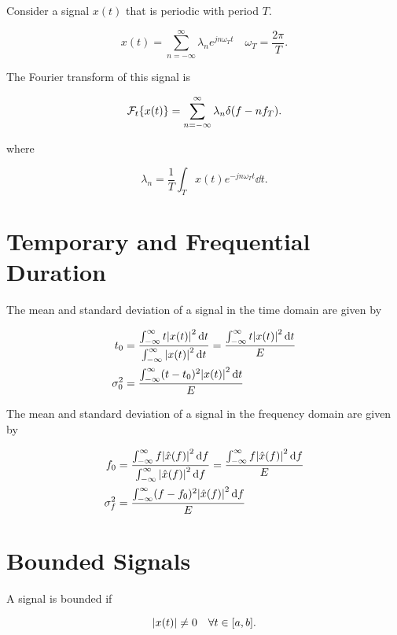 \documentclass{report}
\newcommand{\Ft}[1]{\SF_t\!\lt\{ #1 \rt\}}
\begin{document}
Consider a signal $x(t)$ that is periodic with period $T$.

\[
	x(t) = \sum_{n=-\infty}^{\infty} \lambda_n e^{jn\omega_Tt} \quad \omega_T = \frac{2\pi}{T}
	.\]

The Fourier transform of this signal is

\[
	\Ft{x(t)} = \sum_{n=-\infty}^{\infty} \lambda_n \delta(f-nf_T)
	.\]

where

\[
	\lambda_n = \frac{1}{T}\int_{T} x(t)e^{-jn\omega_Tt} \dd{t}
	.\]

\section{Temporary and Frequential Duration}

The mean and standard deviation of a signal in the time domain are given by

\begin{align*}
	t_0        & = \frac{\int_{-\infty}^\infty t \abs{x(t)}^2 \dd{t}}{\int_{-\infty}^\infty \abs{x(t)}^2 \dd{t}} = \frac{\int_{-\infty}^\infty t \abs{x(t)}^2 \dd{t}}{E} \\
	\sigma_0^2 & = \frac{\int_{-\infty}^\infty (t-t_0)^2 \abs{x(t)}^2 \dd{t}}{E}
\end{align*}

The mean and standard deviation of a signal in the frequency domain are given by

\begin{align*}
	f_0        & = \frac{\int_{-\infty}^\infty f \abs{\hat{x}(f)}^2 \dd{f}}{\int_{-\infty}^\infty \abs{\hat{x}(f)}^2 \dd{f}} = \frac{\int_{-\infty}^\infty f \abs{\hat{x}(f)}^2 \dd{f}}{E} \\
	\sigma_f^2 & = \frac{\int_{-\infty}^\infty (f-f_0)^2 \abs{\hat{x}(f)}^2 \dd{f}}{E}
\end{align*}


\section{Bounded Signals}

A signal is bounded if

\[
	\abs{x(t)} \neq 0 \quad \forall t \in [a,b]
	.\]
\end{document}
